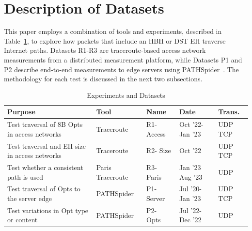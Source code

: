 \documentclass[conference]{IEEEtran}
\begin{document}





\section{Description of Datasets} 
\label{sec:methodology}

This paper employs a combination of tools and experiments, described in Table~\ref{tbl:datasets}, to explore how packets that include an HBH or DST EH traverse Internet paths. 
Datasets R1-R3 are traceroute-based access network measurements from a distributed measurement platform, while  Datasets P1 and P2 describe end-to-end measurements to edge servers using PATHSpider~\cite{learmonth2016pathspider}.
The methodology for each test is discussed in the next two subsections.

\begin{table}
\caption{Experiments and Datasets}
\begin{tabular}{p{}|p{}|p{}|p{}|p{}}
Purpose                                                                          & Tool         & Name & Date               & Trans. \\
\hline
\hline
Test traversal of 8B Opts in access networks             & Traceroute       & R1- Access        & Oct '22- Jan '23 & UDP TCP          \\
\hline
Test traversal and EH size in access networks           & Traceroute       & R2- Size           & Oct '22           & UDP TCP          \\
\hline
Test whether a consistent path is used 			& Paris Traceroute & R3- Paris        & Jan '23 Aug '23           & UDP               \\
\hline
Test traversal of Opts to the server edge              & PATHSpider       & P1- Server            & Jul '20- Jan '23 & UDP TCP          \\
\hline
Test variations in Opt type or content        & PATHSpider       & P2- Opts        & Jul '22- Dec '22     & UDP              
\end{tabular}
  \label{tbl:datasets}
\end{table}
    
\end{document}
